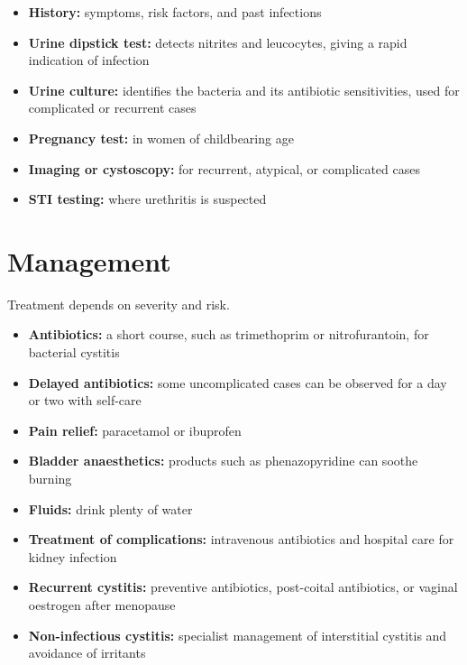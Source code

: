 \begin{itemize}
    \item \textbf{History:} symptoms, risk factors, and past infections
    \item \textbf{Urine dipstick test:} detects nitrites and leucocytes, giving a rapid indication of infection
    \item \textbf{Urine culture:} identifies the bacteria and its antibiotic sensitivities, used for complicated or recurrent cases
    \item \textbf{Pregnancy test:} in women of childbearing age
    \item \textbf{Imaging or cystoscopy:} for recurrent, atypical, or complicated cases
    \item \textbf{STI testing:} where urethritis is suspected
\end{itemize}

\section*{Management}
Treatment depends on severity and risk.

\begin{itemize}
    \item \textbf{Antibiotics:} a short course, such as trimethoprim or nitrofurantoin, for bacterial cystitis
    \item \textbf{Delayed antibiotics:} some uncomplicated cases can be observed for a day or two with self-care
    \item \textbf{Pain relief:} paracetamol or ibuprofen
    \item \textbf{Bladder anaesthetics:} products such as phenazopyridine can soothe burning
    \item \textbf{Fluids:} drink plenty of water
    \item \textbf{Treatment of complications:} intravenous antibiotics and hospital care for kidney infection
    \item \textbf{Recurrent cystitis:} preventive antibiotics, post-coital antibiotics, or vaginal oestrogen after menopause
    \item \textbf{Non-infectious cystitis:} specialist management of interstitial cystitis and avoidance of irritants
\end{itemize}


